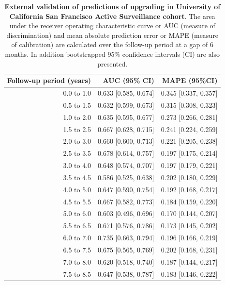 \begin{table}[!htb]
\small\sf\centering
\caption{\textbf{External validation of predictions of upgrading in University of California San Francisco Active Surveillance cohort}. The area under the receiver operating characteristic curve or AUC (measure of discrimination) and mean absolute prediction error or MAPE (measure of calibration) are calculated over the follow-up period at a gap of 6 months. In addition bootstrapped 95\% confidence intervals (CI) are also presented.}
\label{tab:AUC_PE_UCSF}
\begin{tabular}{r|r|r}
\hline
\hline
Follow-up period (years) & AUC (95\% CI) & MAPE (95\%CI)\\ 
\hline
0.0 to 1.0 & 0.633 [0.585, 0.674] & 0.345 [0.337, 0.357]\\
0.5 to 1.5 & 0.632 [0.599, 0.673] & 0.315 [0.308, 0.323]\\
1.0 to 2.0 & 0.635 [0.595, 0.677] & 0.273 [0.266, 0.281]\\
1.5 to 2.5 & 0.667 [0.628, 0.715] & 0.241 [0.224, 0.259]\\
2.0 to 3.0 & 0.660 [0.600, 0.713] & 0.221 [0.205, 0.238]\\
2.5 to 3.5 & 0.678 [0.614, 0.757] & 0.197 [0.175, 0.214]\\
3.0 to 4.0 & 0.648 [0.574, 0.707] & 0.197 [0.179, 0.221]\\
3.5 to 4.5 & 0.586 [0.525, 0.638] & 0.202 [0.180, 0.229]\\
4.0 to 5.0 & 0.647 [0.590, 0.754] & 0.192 [0.168, 0.217]\\
4.5 to 5.5 & 0.667 [0.582, 0.773] & 0.184 [0.159, 0.220]\\
5.0 to 6.0 & 0.603 [0.496, 0.696] & 0.170 [0.144, 0.207]\\
5.5 to 6.5 & 0.671 [0.576, 0.786] & 0.173 [0.145, 0.202]\\
6.0 to 7.0 & 0.735 [0.663, 0.794] & 0.196 [0.166, 0.219]\\
6.5 to 7.5 & 0.675 [0.565, 0.769] & 0.202 [0.168, 0.231]\\
7.0 to 8.0 & 0.620 [0.518, 0.740] & 0.187 [0.144, 0.217]\\
7.5 to 8.5 & 0.647 [0.538, 0.787] & 0.183 [0.146, 0.222]\\
\hline
\end{tabular}	
\end{table}

